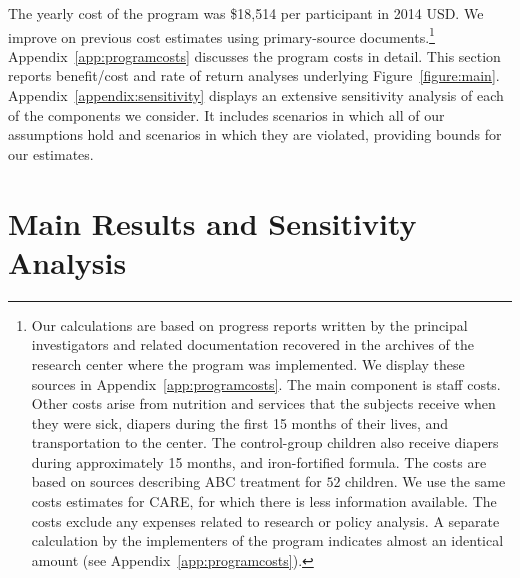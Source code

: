 \noindent The yearly cost of the program was \$18,514 per participant in 2014 USD. We improve on previous cost estimates using primary-source documents.\footnote{Our calculations are based on progress reports written by the principal investigators and related documentation recovered in the archives of the research center where the program was implemented. We display these sources in Appendix~\ref{app:programcosts}. The main component is staff costs. Other costs arise from nutrition and services that the subjects receive when they were sick, diapers during the first 15 months of their lives, and transportation to the center. The control-group children also receive diapers during approximately 15 months, and iron-fortified formula. The costs are based on sources describing ABC treatment for $52$ children. We use the same costs estimates for CARE, for which there is less information available. The costs exclude any expenses related to research or policy analysis. A separate calculation by the implementers of the program indicates almost an identical amount (see  Appendix~\ref{app:programcosts}).} Appendix~\ref{app:programcosts} discusses the program costs in detail. This section reports benefit/cost and rate of return analyses underlying Figure~\ref{figure:main}.  Appendix~\ref{appendix:sensitivity} displays an extensive sensitivity analysis of each of the components we consider. It includes scenarios in which all of our assumptions hold and scenarios in which they are violated, providing bounds for our estimates.

\section{Main Results and Sensitivity Analysis} \label{section:cbaresults}

